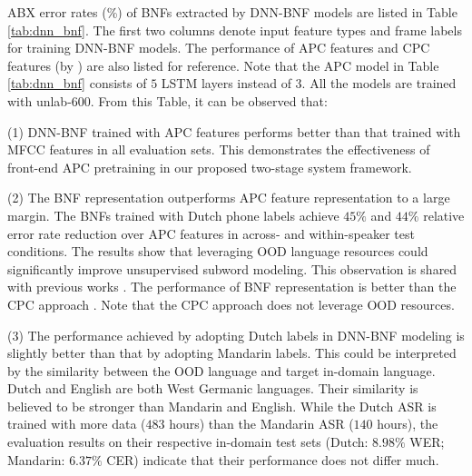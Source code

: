 \documentclass[a4paper]{article}
\begin{document}
ABX error rates (\%) of BNFs extracted by  DNN-BNF  models are listed in Table \ref{tab:dnn_bnf}. The first two columns  denote input feature types and frame labels for training DNN-BNF models.
The performance  of    APC features and CPC features (by \cite{kahn2019librilight}) are also listed for reference. Note that the APC model in Table \ref{tab:dnn_bnf} consists of $5$ LSTM layers instead of $3$. All the models are trained with unlab-600.   From this Table, it can be observed  that:

(1) DNN-BNF trained with APC features performs better than that trained with MFCC features in all evaluation sets. This  demonstrates the effectiveness of front-end APC pretraining in our proposed two-stage system framework.

(2) The BNF representation outperforms APC feature representation to a large margin. The  BNFs trained with  Dutch phone labels  achieve $45\%$ and $44\%$ relative error rate reduction over APC features in across- and within-speaker test conditions. 
The results show that leveraging OOD language resources could significantly improve unsupervised subword modeling. This observation is shared with previous works \cite{shibata2017composite,feng2019_TASLP}. The performance of BNF representation is better than the CPC approach  \cite{riviere2020unsupervised}. Note that the CPC approach does not leverage OOD resources.

(3) The performance achieved by adopting Dutch labels in DNN-BNF modeling is slightly better than that by adopting Mandarin labels. 
This could be interpreted by the similarity between the OOD language and target in-domain language. Dutch and English are both West Germanic languages. Their similarity is believed to be stronger than Mandarin and English. While the Dutch ASR  is trained with more data ($483$ hours) than the Mandarin ASR ($140$ hours), the evaluation results on their respective in-domain test sets (Dutch: $8.98\%$ WER; Mandarin: $6.37\%$ CER) indicate that their performance does not differ much.



\end{document}
